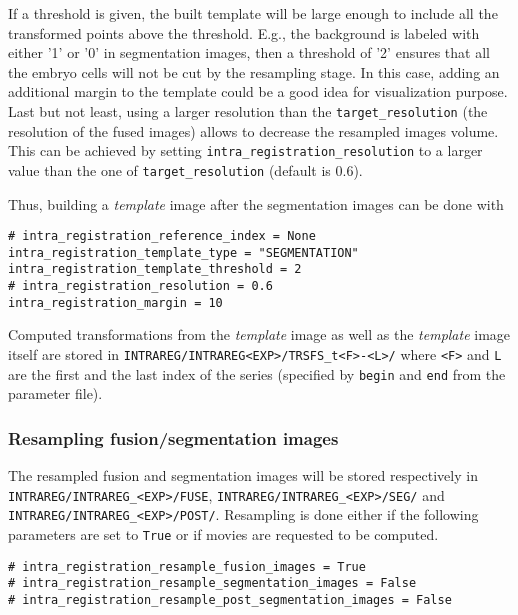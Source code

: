 If a threshold is given, the built template will be large enough to
include all the transformed points above the threshold. E.g., the
background is labeled with either '1' or '0' in segmentation images,
then a threshold of '2' ensures that all the embryo cells will not be
cut by the resampling stage.  In this case, adding an additional
margin to the template could be a good idea for visualization
purpose. Last but not least, using a larger resolution than the
\verb|target_resolution| (the resolution of the fused images) allows
to decrease the resampled images volume. This can be achieved by
setting \verb|intra_registration_resolution| to a larger value than
the one of \verb|target_resolution| (default is 0.6).

Thus, building a \textit{template} image after the segmentation images can be done with
\begin{verbatim}
# intra_registration_reference_index = None
intra_registration_template_type = "SEGMENTATION"
intra_registration_template_threshold = 2
# intra_registration_resolution = 0.6
intra_registration_margin = 10
\end{verbatim}

Computed transformations from the \textit{template} image as well as the \textit{template} image itself are stored in \verb|INTRAREG/INTRAREG<EXP>/TRSFS_t<F>-<L>/| where \verb|<F>| and \verb|L| are the first and the last index of the series (specified by \verb|begin| and \verb|end| from the parameter file).

\subsubsection{Resampling fusion/segmentation images}
\label{sec:cli:intraregistration:resampling}
The resampled fusion and segmentation images will be stored respectively in \verb|INTRAREG/INTRAREG_<EXP>/FUSE|, \verb|INTRAREG/INTRAREG_<EXP>/SEG/| and \verb|INTRAREG/INTRAREG_<EXP>/POST/|. Resampling is done either if the following parameters are set to \verb|True| or if movies are requested to be computed.

\begin{verbatim}
# intra_registration_resample_fusion_images = True
# intra_registration_resample_segmentation_images = False
# intra_registration_resample_post_segmentation_images = False
\end{verbatim}

